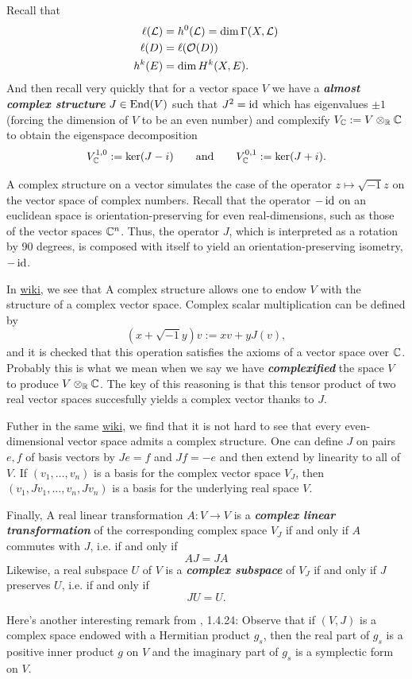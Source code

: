 Recall that
\begin{align*}
	\ell(\mathcal{L})&=h^0(\mathcal{L})=\dim\Gamma(X,\mathcal{L})\\
	\ell(D)&=\ell(\mathcal{O}(D))\\
	h^k(E)&=\dim H^k(X,E).
\end{align*}
And then recall very quickly that for a vector space $V$ we have a \textbf{\textit{almost complex structure}} $J\in\operatorname{End}(V)$ such that $J^2=\operatorname{id}$ which has eigenvalues $\pm1$ (forcing the dimension of $V$ to be an even number) and complexify $V_{\mathbb{C}}:=V\otimes_{\mathbb{R}}\mathbb{C}$ to obtain the eigenspace decomposition
\[V^{1,0}_{\mathbb{C}}:=\ker(J-i)\qquad\text{and}\qquad V^{0,1}_{\mathbb{C}}:=\ker(J+i).\]
\begin{remark}
	A complex structure on a vector simulates the case of the operator $z\mapsto \sqrt{-1}z$ on the vector space of complex numbers. Recall that the operator $-\operatorname{id}$ on an euclidean space is orientation-preserving for even real-dimensions, such as those of the vector spaces $\mathbb{C}^n$. Thus, the operator $J$, which is interpreted as a rotation by 90 degrees, is composed with itself to yield an orientation-preserving isometry, $-\operatorname{id}$.
	
	In \href{https://en.wikipedia.org/wiki/Linear_complex_structure#Definition_and_properties}{wiki}, we see that A complex structure allows one to endow $V$ with the structure of a complex vector space. Complex scalar multiplication can be defined by
	\[(x+\sqrt{-1}y)v:=xv+yJ(v),\]
	and it is checked that this operation satisfies the axioms of a vector space over $\mathbb{C}$. {\color{cyan}Probably this is what we mean when we say we have \textbf{\textit{complexified}} the space $V$ to produce $V\otimes_{\mathbb{R}}\mathbb{C}$. The key of this reasoning is that this tensor product of two real vector spaces succesfully yields a complex vector thanks to $J$.}
	
	Futher in the same \href{https://en.wikipedia.org/wiki/Linear_complex_structure#Definition_and_properties}{wiki}, we find that it is not hard to see that every even-dimensional vector space admits a complex structure. One can define $J$ on pairs $e,f$ of basis vectors by $Je = f$ and $Jf = -e$ and then extend by linearity to all of $V$. If $(v_1, \ldots, v_n)$ is a basis for the complex vector space $V_J$, then $(v_1,Jv_1,\ldots,v_n,Jv_n)$ is a basis for the underlying real space $V$.
	
	Finally, A real linear transformation $A : V \to V$ is a \textbf{\textit{complex linear transformation}} of the corresponding complex space $V_J$ if and only if $A$ commutes with $J$, i.e. if and only if
	\[AJ=JA\]
	Likewise, a real subspace $U$ of $V$ is a \textbf{\textit{complex subspace}} of $V_J$ if and only if $J$ preserves $U$, i.e. if and only if
	\[JU=U.\]
\end{remark}
\begin{remark}
	Here's another interesting remark from \cite{piccione}, 1.4.24: Observe that if $(V,J)$ is a complex space endowed with a Hermitian product $g_s$, then the real part of $g_s$ is a positive inner product $g$ on $V$ and the imaginary part of $g_s$ is a symplectic form on $V$. 
\end{remark}

